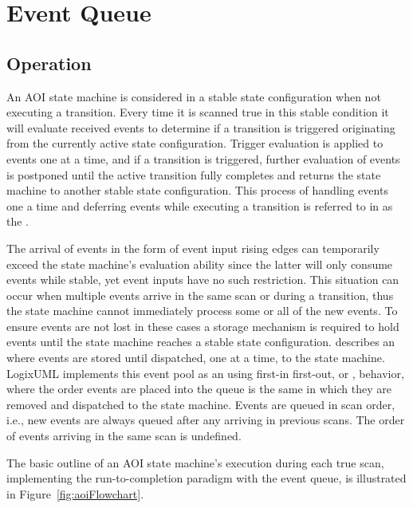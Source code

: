 \section{Event Queue}
\label{sec:eventQueue}


\subsection{Operation}

An AOI state machine is considered in a stable state configuration when
not executing a transition. Every time it is scanned true in this stable
condition it will evaluate received events to determine
if a transition is triggered
originating from the currently active state configuration. Trigger evaluation
is applied to events one at a time, and if a transition is triggered,
further evaluation of events is postponed until the active transition
fully completes and returns the state machine to another stable state
configuration. This process of handling events one a time and deferring
events while executing a transition is referred to in
\textcite[\S14.2.3.9.1]{OMGUML} as the
.

The arrival of events in the form of event input rising edges can
temporarily exceed the state machine's evaluation ability since the latter
will only consume events while stable, yet event inputs have no such
restriction. This situation can occur when multiple events arrive in the
same scan or during a transition, thus the state machine cannot immediately
process some or all of the new events.
To ensure events are not lost in these cases
a storage mechanism is required to hold events until
the state machine reaches a stable state configuration.
\textcite[\S13.3.3]{OMGUML} describes an
 where events are stored until dispatched,
one at a time, to the state machine. LogixUML implements this event pool
as an  using first-in first-out, or
, behavior, where the order events are
placed into the queue is the same in which they are removed and dispatched
to the state machine. Events are queued in scan order, i.e., new events are
always queued after any arriving in previous scans. The order of
events arriving in the same scan is undefined.

The basic outline of an AOI state machine's execution during each true scan,
implementing the run-to-completion paradigm with the event queue, is
illustrated in Figure~\ref{fig:aoiFlowchart}.

